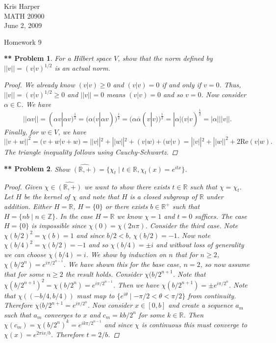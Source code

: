 \documentclass{article}
\newtheorem{**}{** Problem}
\newcommand{\re}{\text{Re}}
\begin{document}
\begin{flushright}
Kris Harper\\

MATH 20900\\

June 2, 2009
\end{flushright}

\begin{center}
Homework 9
\end{center}

\begin{**}
For a Hilbert space $V$, show that the norm defined by $||v|| = (v|v)^{1/2}$ is an actual norm.
\begin{proof}
We already know $(v|v) \geq 0$ and $(v|v) = 0$ if and only if $v = 0$. Thus, $||v|| = (v|v)^{1/2} \geq 0$ and $||v|| = 0$ means $(v|v) = 0$ and so $v = 0$. Now consider $\alpha \in \mathbb{C}$. We have
\[
||\alpha v|| = (\alpha v | \alpha v)^{\frac{1}{2}} = (\alpha(v|\alpha v))^{\frac{1}{2}} = (\alpha \overline{\alpha}(v|v))^{\frac{1}{2}} = |\alpha|(v|v)^{\frac{1}{2}} = |\alpha|||v||.
\]
Finally, for $w \in V$, we have
\[
||v+w||^2 = (v + w|v+w) = ||v||^2 + ||w||^2 + (v|w) + (w|v) = ||v||^2 + ||w||^2 + 2 \re (v|w).
\]
The triangle inequality follows using Cauchy-Schwartz.
\end{proof}
\end{**}

\begin{**}
Show $\widehat{(\mathbb{R},+)} = \{\chi_t \mid t \in \mathbb{R}, \chi_t(x) = e^{itx}\}$.
\begin{proof}
Given $\chi \in \widehat{(\mathbb{R},+)}$ we want to show there exists $t \in \mathbb{R}$ such that $\chi = \chi_t$. Let $H$ be the kernel of $\chi$ and note that $H$ is a closed subgroup of $\mathbb{R}$ under addition. Either $H = \mathbb{R}$, $H = \{0\}$ or there exists $b \in \mathbb{R}^+$ such that $H = \{nb \mid n \in \mathbb{Z}\}$. In the case $H = \mathbb{R}$ we know $\chi = 1$ and $t = 0$ suffices. The case $H = \{0\}$ is impossible since $\chi(0) = \chi(2n\pi)$. Consider the third case. Note $\chi(b/2)^2 = \chi(b) = 1$ and since $b/2 < b$, $\chi(b/2) = -1$. Now note $\chi(b/4)^2 = \chi(b/2) = -1$ and so $\chi(b/4) = \pm i$ and without loss of generality we can choose $\chi(b/4) = i$. We show by induction on $n$ that for $n \geq 2$, $\chi(b/2^n) = e^{i \pi/2^{n-1}}$. We have shown this for the base case, $n = 2$, so now assume that for some $n \geq 2$ the result holds. Consider $\chi(b/2^{n+1}$. Note that $\chi(b/2^{n+1})^2 = \chi(b/2^n) = e^{i \pi/2^{n-1}}$. Then we have $\chi(b/2^{n+1}) = \pm e^{i \pi/2^n}$. Note that $\chi((-b/4,b/4))$ must map to $\{e^{i \theta} \mid -\pi/2 < \theta < \pi/2\}$ from continuity. Therefore $\chi(b/2^{n+1} = e^{i \pi/2^n}$. Now consider $x \in [0,b]$ and create a sequence $a_m$ such that $a_m$ converges to $x$ and $c_m = kb/2^n$ for some $k \in \mathbb{R}$. Then $\chi(c_m) = \chi(b/2^n)^k = e^{i k \pi/2^{n-1}}$ and since $\chi$ is continuous this must converge to $\chi(x) = e^{2 \pi i x/b}$. Therefore $t = 2/b$.
\end{proof}
\end{**}
\end{document}
